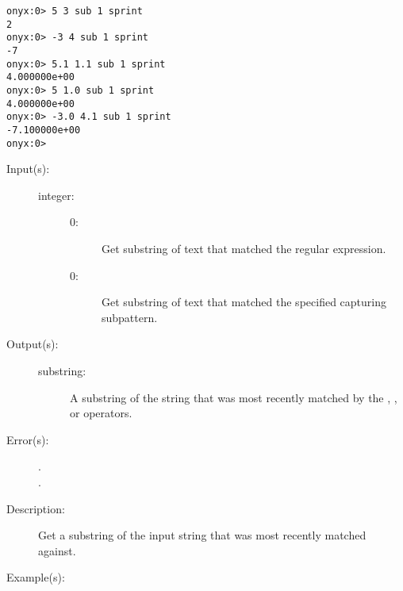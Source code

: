 \begin{description}
\begin{description}
\begin{verbatim}
onyx:0> 5 3 sub 1 sprint
2
onyx:0> -3 4 sub 1 sprint
-7
onyx:0> 5.1 1.1 sub 1 sprint
4.000000e+00
onyx:0> 5 1.0 sub 1 sprint
4.000000e+00
onyx:0> -3.0 4.1 sub 1 sprint
-7.100000e+00
onyx:0>
		\end{verbatim}
	\end{description}
\label{systemdict:submatch}
\item[{\onyxop{integer}{submatch}{substring}}: ]
	\begin{description}\item[]
	\item[Input(s): ]
		\begin{description}\item[]
		\item[integer: ]
			\begin{description}\item[]
			\item[0: ]
				Get substring of text that matched the regular
				expression.
			\item[{\gt}0: ]
				Get substring of text that matched the specified
				capturing subpattern.
			\end{description}
		\end{description}
	\item[Output(s): ]
		\begin{description}\item[]
		\item[substring: ]
			A substring of the string that was most recently matched
			by the
			,
			, or
			operators.
		\end{description}
	\item[Error(s): ]
		\begin{description}\item[]
		\item[.]
		\item[.]
		\end{description}
	\item[Description: ]
		Get a substring of the input string that was most recently
		matched against.
	\item[Example(s): ]\begin{verbatim}


\end{verbatim}
\end{description}
\end{description}
